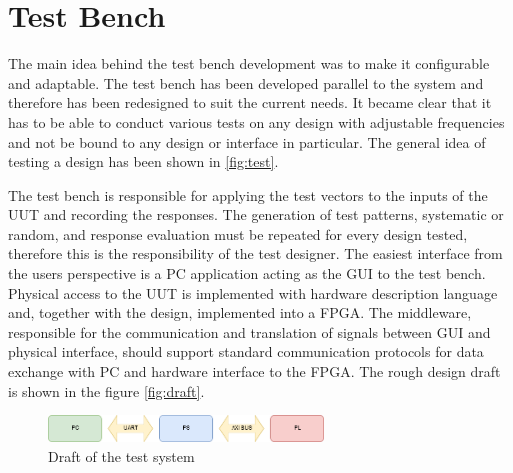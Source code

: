 \chapter{Test Bench}
The main idea behind the test bench development was to make it configurable and adaptable. The test bench has been developed parallel to the system and therefore has been redesigned to suit the current needs. It became clear that it has to be able to conduct various tests on any design with adjustable frequencies and not be bound to any design or interface in particular. The general idea of testing a design has been shown in \autoref{fig:test}.

The test bench is responsible for applying the test vectors to the inputs of the UUT and recording the responses. The generation of test patterns, systematic or random, and response evaluation must be repeated for every design tested, therefore this is the responsibility of the test designer. The easiest interface from the users perspective is a PC application acting as the GUI to the test bench. Physical access to the UUT is implemented with hardware description language and, together with the design, implemented into a FPGA. The middleware, responsible for the communication and translation of signals between GUI and physical interface, should support standard communication protocols for data exchange with PC and hardware interface to the FPGA. The rough design draft is shown in the figure \autoref{fig:draft}.\\
 

\begin{figure}[H]
\centering
\includegraphics[width=0.65\textwidth]{figures/PCPSPL.png}
\caption{Draft of the test system}
\label{fig:draft}
\end{figure}

